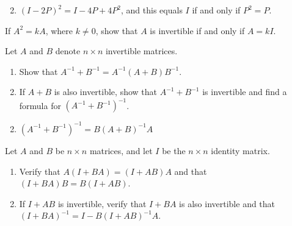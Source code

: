 \begin{multicols}{2}
\begin{ex}
\begin{enumerate}[label={\alph*.}]
\end{enumerate}
\begin{sol}
\begin{enumerate}[label={\alph*.}]
\setcounter{enumi}{1}
\item  $(I - 2P)^{2} = I - 4P + 4P^{2}$, and this equals $I$ if and only if $P^{2} = P$.

\end{enumerate}
\end{sol}
\end{ex}

\begin{ex}
If $A^{2} = kA$, where $k \neq 0$, show that $A$ is invertible if and only if $A = kI$.
\end{ex}

\begin{ex}
Let $A$ and $B$ denote $n \times n$ invertible matrices.


\begin{enumerate}[label={\alph*.}]
\item Show that $A^{-1} + B^{-1} = A^{-1}(A + B)B^{-1}$.

\item If $A + B$ is also invertible, show that $A^{-1} + B^{-1}$ is invertible and find a formula for $(A^{-1} + B^{-1})^{-1}$.

\end{enumerate}
\begin{sol}
\begin{enumerate}[label={\alph*.}]
\setcounter{enumi}{1}
\item $(A^{-1} + B^{-1})^{-1} = B(A + B)^{-1}A$

\end{enumerate}
\end{sol}
\end{ex}

\begin{ex}
Let $A$ and $B$ be $n \times n$ matrices, and let $I$ be the $n \times n$ identity matrix.


\begin{enumerate}[label={\alph*.}]
\item Verify that $A(I + BA) = (I + AB)A$ and that \newline $(I + BA)B = B(I + AB)$.

\item If $I + AB$ is invertible, verify that $I + BA$ is also invertible and that $(I + BA)^{-1} = I - B(I + AB)^{-1}A$.

\end{enumerate}
\end{ex}
\end{multicols}

